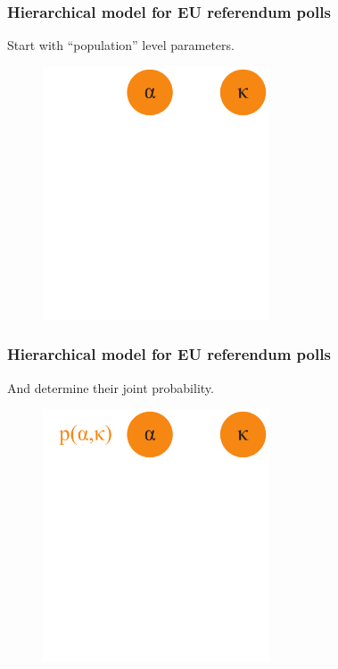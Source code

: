 \documentclass[handout]{beamer}
\begin{document}
\begin{frame}
	\frametitle{Hierarchical model for EU referendum polls}
	
	 Start with ``population'' level parameters.
	
	\begin{figure}[ht]
		\centerline{\includegraphics[width=0.6\textwidth]{figures/lec6_conditionalIndependence5.pdf}}
	\end{figure}
	
	
\end{frame}

\begin{frame}
	\frametitle{Hierarchical model for EU referendum polls}
	
	And determine their joint probability.
	
	\begin{figure}[ht]
		\centerline{\includegraphics[width=0.6\textwidth]{figures/lec6_conditionalIndependence4.pdf}}
	\end{figure}
	
\end{frame}
\end{document}
